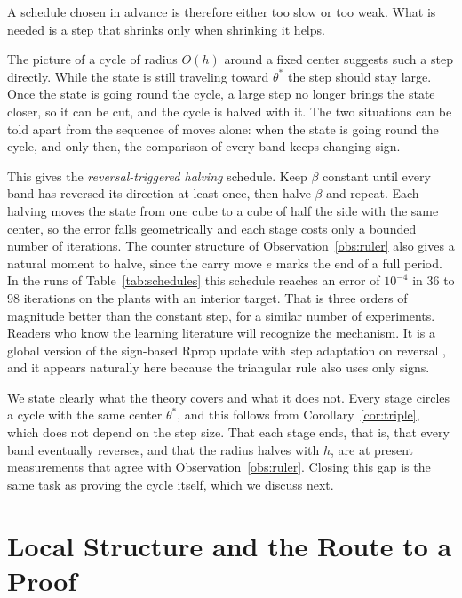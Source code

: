 \documentclass[letterpaper, 10pt, conference, twocolumn]{ieeeconf}
\begin{document}
A schedule chosen in advance is therefore either too slow or too weak. What is
needed is a step that shrinks only when shrinking it helps.


The picture of a cycle of radius $O(h)$ around a fixed center suggests such a
step directly. While the state is still traveling toward $\theta^*$ the step
should stay large. Once the state is going round the cycle, a large step no longer brings
the state closer, so it can be cut, and the cycle is halved with it. The two
situations can be told apart from the sequence of moves alone: when the state
is going round the cycle, and only then, the comparison of every band keeps
changing sign.

This gives the \emph{reversal-triggered halving} schedule. Keep $\beta$
constant until every band has reversed its direction at least once, then halve
$\beta$ and repeat. Each halving moves the state from one cube to a cube of
half the side with the same center, so the error falls geometrically and each
stage costs only a bounded number of iterations. The counter structure of
Observation~\ref{obs:ruler} also gives a natural moment to halve, since the
carry move $e$ marks the end of a full period. In the runs of
Table~\ref{tab:schedules} this schedule reaches an error of $10^{-4}$ in $36$
to $98$ iterations on the plants with an interior target. That is three orders
of magnitude better than the constant step, for a similar number of
experiments. Readers who know the learning literature will recognize the
mechanism. It is a global version of the sign-based Rprop update with
step adaptation on reversal \cite{Riedmiller1993}, and it appears naturally
here because the triangular rule also uses only signs.

We state clearly what the theory covers and what it does not. Every stage
circles a cycle with the same center $\theta^*$, and this follows from
Corollary~\ref{cor:triple}, which does not depend on the step size. That each
stage ends, that is, that every band eventually reverses, and that the radius
halves with $h$, are at present measurements that agree with
Observation~\ref{obs:ruler}. Closing this gap is the same task as proving the
cycle itself, which we discuss next.

\section{Local Structure and the Route to a Proof}
\label{sec:structure}
\end{document}
